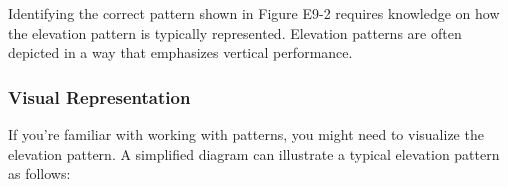 Identifying the correct pattern shown in Figure E9-2 requires knowledge on how the elevation pattern is typically represented. Elevation patterns are often depicted in a way that emphasizes vertical performance.

\subsubsection{Visual Representation}

If you're familiar with working with patterns, you might need to visualize the elevation pattern. A simplified diagram can illustrate a typical elevation pattern as follows: 

\begin{center}
\end{center}
